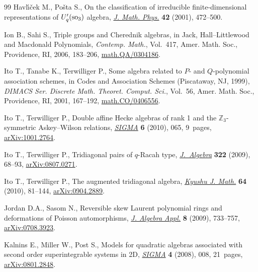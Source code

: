 \documentclass[pdftex]{sigma}
\numberwithin{equation}{section}
\begin{document}
\begin{thebibliography}{99}
Havl{\'{\i}}{\v{c}}ek M.,  Po\v{s}ta S.,
On the classif\/ication of irreducible f\/inite-dimensional representations of $U'_q({\rm so}_3)$ algebra,
\href{http://dx.doi.org/10.1063/1.1328078}{{\it J. Math. Phys.}} {\bf 42} (2001), 472--500.




Ion B., Sahi S.,
Triple groups and Cherednik algebras,
in Jack, Hall--Littlewood and Macdonald Polynomials,
{\it Contemp. Math.}, Vol.~417, Amer. Math. Soc., Providence, RI, 2006, 183--206,
\href{http://arxiv.org/abs/math.QA/0304186}{math.QA/0304186}.

Ito T., Tanabe K., Terwilliger P.,
Some algebra related to ${P}$- and ${Q}$-polynomial association schemes,
in Codes and Association Schemes (Piscataway, NJ, 1999), {\it DIMACS Ser. Discrete Math. Theoret. Comput. Sci.}, Vol.~56, Amer. Math. Soc., Providence, RI, 2001, 167--192,
\href{http://arxiv.org/abs/math.CO/0406556}{math.CO/0406556}.

Ito T., Terwilliger P.,
Double af\/f\/ine Hecke algebras of rank 1 and the $\mathbb Z_3$-symmetric Askey--Wilson relations,
\href{http://dx.doi.org/10.3842/SIGMA.2010.065}{{\it SIGMA}} {\bf 6} (2010),  065, 9~pages,
\href{http://arxiv.org/abs/1001.2764}{arXiv:1001.2764}.




Ito T., Terwilliger P.,
Tridiagonal pairs of $q$-Racah type,
\href{http://dx.doi.org/10.1016/j.jalgebra.2009.04.008}{{\it J.~Algebra}} {\bf 322} (2009), 68--93,
\href{http://arxiv.org/abs/0807.0271}{arXiv:0807.0271}.

Ito T., Terwilliger P.,
The augmented tridiagonal algebra,
\href{http://dx.doi.org/10.2206/kyushujm.64.81}{{\it Kyushu J. Math.}}  {\bf 64}  (2010), 81--144,
\href{http://arxiv.org/abs/0904.2889}{arXiv:0904.2889}.

Jordan D.A., Sasom N.,
Reversible skew Laurent polynomial rings and deformations of Poisson automorphisms,
\href{http://dx.doi.org/10.1142/S0219498809003564}{{\it J. Algebra Appl.}} {\bf 8} (2009),   733--757,
\href{http://arxiv.org/abs/0708.3923}{arXiv:0708.3923}.


Kalnins E., Miller W., Post S.,
Models for quadratic algebras associated with second order superintegrable systems in 2D,
\href{http://dx.doi.org/10.3842/SIGMA.2008.008}{{\it SIGMA}} {\bf 4}  (2008), 008, 21~pages,
\href{http://arxiv.org/abs/0801.2848}{arXiv:0801.2848}.



\end{thebibliography}
\end{document}
